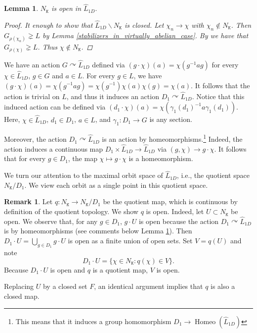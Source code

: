 \documentclass[11pt, twoside]{amsart}
\newcommand{\mt}{\mathtt}
\newcommand{\wh}{\widehat}
\newtheorem{lemma}[thm]{Lemma}
\theoremstyle{definition}
\newtheorem{rmk}[thm]{Remark}
\begin{document}
\begin{lemma}\label{desired orbit is open}
    $N_{\mt{K}}$ is open in $\wh{L}_{1D}.$
    \begin{proof}
           It enough to show that $\wh{L}_{1D}\backslash N_{\mt{K}}$ is closed.
            Let $\chi_n\to \chi$ with $\chi_n\notin N_{\mt{K}}$. Then $G_{\rho(\chi_n)}\gneq L$ by Lemma \ref{stabilizers_in_virtually_abelian_case}. By \cite[Prop 4.12]{CW24} we have that $G_{\rho(\chi)}\gneq L$. Thus $\chi\notin N_{\mt{K}}$. 
    \end{proof}
\end{lemma}

We have an action $G\curvearrowright \widehat{L}_{1D}$ defined via $(g\cdot \chi)(a)=\chi(g^{-1}ag)$ for every $\chi\in \wh{L}_{1D}$, $g\in G$ and $a\in L$. For every $g\in L$, we have $(g\cdot \chi)(a)=\chi(g^{-1}ag)=\chi(g^{-1})\chi(a)\chi(g)=\chi(a)$. It follows that the action is trivial on $L$, and thus it induces an action $D_1\curvearrowright \wh{L}_{1D}$. Notice that this induced action can be defined via $(d_1\cdot \chi)(a)=\chi(\gamma_1(d_1)^{-1}a\gamma_1(d_1))$. Here, $\chi\in \wh{L}_{1D}$, $d_1\in D_1$, $a\in L$, and $\gamma_1:D_1\to G$ is any section. \par
Moreover, the action $D_1\curvearrowright \wh{L}_{1D}$ is an action by homeomorphisms.\footnote{This means that it induces a group homomorphism $D_1\to \operatorname{Homeo}(\wh{L}_{1D})$} Indeed, the action induces a continuous map $D_1\times \wh{L}_{1D}\to \wh{L}_{1D}$ via $(g,\chi)\to g\cdot \chi$. It follows that for every $g\in D_1$, the map $\chi\mapsto g\cdot \chi$ is a homeomorphism. \par
We turn our attention to the maximal orbit space of $\wh{L}_{1D}$, i.e., the quotient space $N_{\mt{K}}/D_1$.
We view each orbit as a single point in this quotient space. \par

\begin{rmk}\label{rmk:quotient_map}
Let $q:N_{\mt{K}}\rightarrow N_{\mt{K}}/D_1$ be the quotient map, which is continuous by definition of the quotient topology. We show $q$ is open. Indeed, let $U\subset N_{\mt{K}}$ be open. We observe that, for any $g\in D_1$, $g\cdot U$ is open because the action $D_1\curvearrowright \wh{L}_{1D}$ is by homeomorphisms (see comments below Lemma \ref{desired orbit is open}). Then $D_1\cdot U=\bigcup_{g\in D_1}g\cdot U$ is open as a finite union of open sets. Set $V=q(U)$ and note 
\[D_1\cdot U=\{\chi\in N_{\mt{K}}: q(\chi)\in V\}.\]
Because $D_1\cdot U$ is open and $q$ is a quotient map, $V$ is open. \par
Replacing $U$ by a closed set $F$, an identical argument implies that $q$ is also a closed map. 
\end{rmk}
\end{document}
